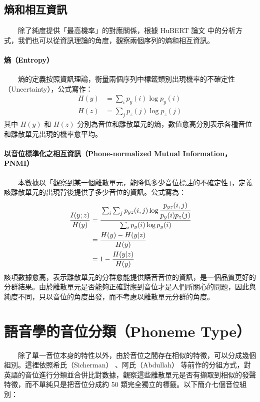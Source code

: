 {\subsection{熵和相互資訊}

　　除了純度提供「最高機率」的對應關係，根據 HuBERT 論文 \cite{hsu_hubert_2021-2} 中的分析方式，我們也可以從資訊理論的角度，觀察兩個序列的熵和相互資訊。

\paragraph{熵（Entropy）} \hfill \break
%
　　熵的定義按照資訊理論，衡量兩個序列中標籤類別出現機率的不確定性（Uncertainty），公式寫作：
\begin{align}
    H(y) & = \sum_i{p_y(i)\log p_y(i)} \\
    H(z) & = \sum_j{p_z(j)\log p_z(j)}
\end{align}
其中 $H(y)$ 和 $H(z)$ 分別為音位和離散單元的熵，數值愈高分別表示各種音位和離散單元出現的機率愈平均。

\paragraph{以音位標準化之相互資訊（Phone-normalized Mutual Information，PNMI）}\hfill \break
%
　　本數據以「觀察到某一個離散單元，能降低多少音位標註的不確定性」，定義該離散單元的出現背後提供了多少音位的資訊。公式寫為：
\begin{align}
    \frac{I(y;z)}{H(y)} & =\cfrac{\sum_i \sum_j p_{yz}(i, j) \log \cfrac{p_{yz}(i, j)}{p_y(i)p_z(j)}}{\sum_i p_y(i) \log p_y(i)} \\
                        & =\frac{H(y)-H(y|z)}{H(y)}                                                                              \\
                        & =1-\frac{H(y|z)}{H(y)}
\end{align}
        該項數據愈高，表示離散單元的分群愈能提供語音音位的資訊，是一個品質更好的分群結果。由於離散單元是否能夠正確對應到音位才是人們所關心的問題，因此與純度不同，只以音位的角度出發，而不考慮以離散單元分群的角度。

\section{語音學的音位分類（Phoneme Type）}

　　除了單一音位本身的特性以外，由於音位之間存在相似的特徵，可以分成幾個組別。這裡依照希氏（Sicherman） \cite{10097097}、阿氏（Abdullah）\cite{abdullah23_interspeech} 等前作的分組方式，對英語的音位進行分類並合併比對數據，觀察這些離散單元是否有擷取到相似的發聲特徵，而不單純只是把音位分成約 50 類完全獨立的標籤。以下簡介七個音位組別：
        
}
